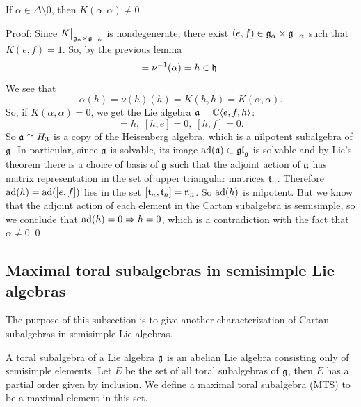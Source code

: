 \begin{dang}
    \begin{lemma}
        If $\alpha\in\Delta\setminus0$, then $K(\alpha,\alpha)\neq0$.
    \end{lemma}
\end{dang}
Proof: Since $K\big|_{\mathfrak{g}_\alpha\times\mathfrak{g}_{-\alpha}}$ is nondegenerate, 
there exist $(e,f)\in\mathfrak{g}_\alpha\times\mathfrak{g}_{-\alpha}$ such that $K(e,f)=1$. So, by the previous lemma
\begin{equation}
    [e,f]=\nu^{-1}(\alpha)=h\in\fr{h}.
\end{equation}
We see that 
\begin{equation}
    \alpha(h)=\nu(h)(h)=K(h,h)=K(\alpha,\alpha).
\end{equation}
So, if $K(\alpha,\alpha)=0$, we get the Lie algebra $\mathfrak{a}=\mathbb{C}\langle e,f,h\rangle$:
\begin{equation}
    [e,f]=h,\;[h,e]=0,\;[h,f]=0.
\end{equation}
So $\mathfrak{a}\cong H_3$ is a copy of the Heisenberg algebra, which is a nilpotent subalgebra of $\mathfrak{g}$. 
In particular, since $\mathfrak{a}$ is solvable, its image $\text{ad}(\mathfrak{a})\subset \mathfrak{gl}_{\mathfrak{g}}$ is solvable and 
by Lie's theorem there is a choice of basis of $\mathfrak{g}$ such that the adjoint action of $\mathfrak{a}$ has matrix representation
in the set of upper triangular matrices $\mathfrak{t}_n$. Therefore $\text{ad}(h)=\text{ad}([e,f])$ lies in the set 
$[\mathfrak{t}_n,\mathfrak{t}_n]=\mathfrak{n}_n$. So $\text{ad}(h)$ is nilpotent. But we know that the adjoint action of each element 
in the Cartan subalgebra is semisimple, so we conclude that $\text{ad}(h)=0\Rightarrow h=0$, which is a contradiction 
with the fact that $\alpha\neq0$.\qed

\subsection{Maximal toral subalgebras in semisimple Lie algebras}
The purpose of this subsection is to give another characterization of Cartan subalgebras in semisimple Lie algebras.
\begin{dang}
    \begin{definition}
        A toral subalgebra of a Lie algebra $\mathfrak{g}$ is an abelian Lie algebra consisting only of semisimple elements. Let $E$
        be the set of all toral subalgebras of $\mathfrak{g}$, then $E$ has a partial order given by inclusion. We define 
        a maximal toral subalgebra (MTS) to be a maximal element in this set.
    \end{definition}
\end{dang}


